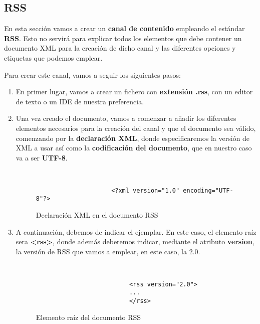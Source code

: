 \subsection{RSS}
En esta sección vamos a crear un \textbf{canal de contenido} empleando el estándar \textbf{RSS}. Esto no servirá para explicar todos los elementos que debe contener un documento XML para la creación de dicho canal y las diferentes opciones y etiquetas que podemos emplear.

Para crear este canal, vamos a seguir los siguientes pasos:

\begin{enumerate}
    \item En primer lugar, vamos a crear un fichero con \textbf{extensión .rss}, con un editor de texto o un IDE de nuestra preferencia.

    \item Una vez creado el documento, vamos a comenzar a añadir los diferentes elementos necesarios para la creación del canal y que el documento sea válido, comenzando por la \textbf{declaración XML}, donde especificaremos la versión de XML a usar así como la \textbf{codificación del documento}, que en nuestro caso va a ser \textbf{UTF-8}.

    \begin{figure}[H]
        \begin{tcolorbox}[sharp corners, colback=yellow!30, colframe=white!20]
            \scriptsize
            \begin{verbatim}


                     <?xml version="1.0" encoding="UTF-8"?>
            \end{verbatim}
        \end{tcolorbox}
        \caption{Declaración XML en el documento RSS}
    \end{figure}

    \item A continuación, debemos de indicar el ejemplar. En este caso, el elemento raíz sera \textbf{<rss>}, donde además deberemos indicar, mediante el atributo \textbf{version}, la versión de RSS que vamos a emplear, en este caso, la 2.0.

       \begin{figure}[H]
        \begin{tcolorbox}[sharp corners, colback=yellow!30, colframe=white!20]
            \scriptsize
            \begin{verbatim}


                          <rss version="2.0">
                          ...
                          </rss>
            \end{verbatim}
        \end{tcolorbox}
        \caption{Elemento raíz del documento RSS}
    \end{figure}


\end{enumerate}
